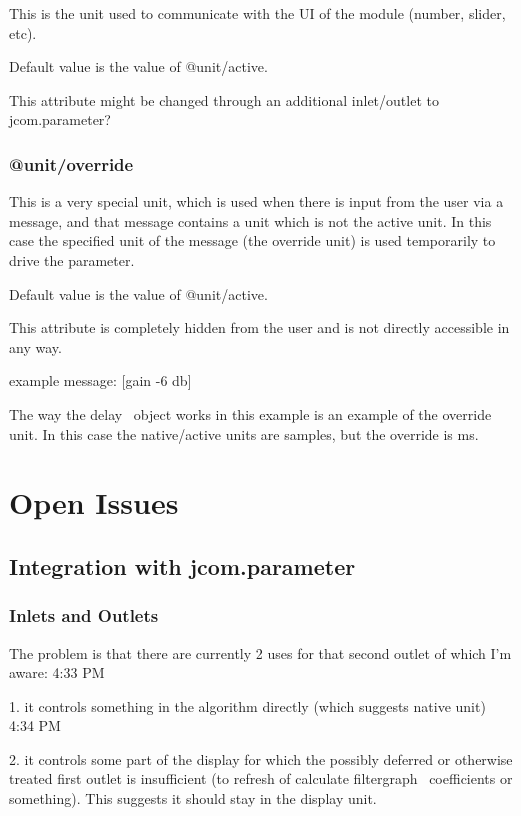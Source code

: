 \documentclass[]{article}
\begin{document}
This is the unit used to communicate with the UI of the module (number, slider, etc).

Default value is the value of @unit/active.

This attribute might be changed through an additional inlet/outlet to jcom.parameter?


\subsubsection{@unit/override}

This is a very special unit, which is used when there is input from the user via a message, and that message contains a unit which is not the active unit.  In this case the specified unit of the message (the override unit) is used temporarily to drive the parameter.

Default value is the value of @unit/active.

This attribute is completely hidden from the user and is not directly accessible in any way.

example message:     [gain -6 db]

The way the delay~ object works in this example is an example of the override unit.  In this case the native/active units are samples, but the override is ms.






\section{Open Issues}

\subsection{Integration with jcom.parameter}

\subsubsection{Inlets and Outlets}

The problem is that there are currently 2 uses for that second outlet of which I'm aware:
4:33 PM
 
1. it controls something in the algorithm directly (which suggests native unit)
4:34 PM
 
2. it controls some part of the display for which the possibly deferred or otherwise treated first outlet is insufficient (to refresh of calculate filtergraph~ coefficients or something).  This suggests it should stay in the display unit.
\end{document}
